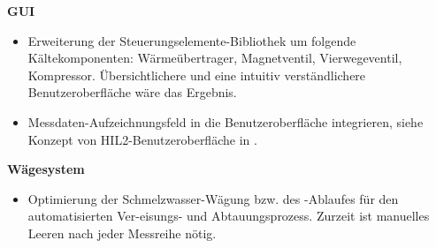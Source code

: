 \textbf{GUI}

\begin{itemize}
\item Erweiterung der Steuerungselemente-Bibliothek um folgende Kältekomponenten: Wärmeübertrager, Magnetventil, Vierwegeventil, Kompressor. Übersichtlichere und eine intuitiv verständlichere Benutzeroberfläche wäre das Ergebnis.
\item Messdaten-Aufzeichnungsfeld in die Benutzeroberfläche integrieren, siehe Konzept von HIL2-Benutzeroberfläche in \citep{Nuerenberg2015}.
\end{itemize}

\textbf{Wägesystem}
\begin{itemize}
\item Optimierung der Schmelzwasser-Wägung bzw. des -Ablaufes für den automatisierten Ver-eisungs- und Abtauungsprozess. Zurzeit ist manuelles Leeren nach jeder Messreihe nötig.
\end{itemize}


